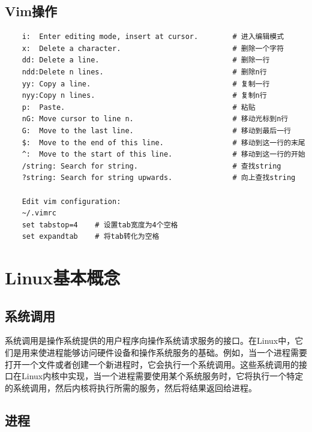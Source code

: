 \documentclass[12pt, a4paper, oneside]{ctexbook}
\numberwithin{figure}{section}
\begin{document}
\subsection{Vim操作}
\begin{verbatim}
    i:  Enter editing mode, insert at cursor.        # 进入编辑模式
    x:  Delete a character.                          # 删除一个字符
    dd: Delete a line.                               # 删除一行
    ndd:Delete n lines.                              # 删除n行
    yy: Copy a line.                                 # 复制一行
    nyy:Copy n lines.                                # 复制n行
    p:  Paste.                                       # 粘贴
    nG: Move cursor to line n.                       # 移动光标到n行
    G:  Move to the last line.                       # 移动到最后一行
    $:  Move to the end of this line.                # 移动到这一行的末尾
    ^:  Move to the start of this line.              # 移动到这一行的开始
    /string: Search for string.                      # 查找string
    ?string: Search for string upwards.              # 向上查找string
    
    Edit vim configuration:
    ~/.vimrc
    set tabstop=4    # 设置tab宽度为4个空格
    set expandtab    # 将tab转化为空格
    \end{verbatim}
\section{Linux基本概念}

\subsection{系统调用}
    
系统调用是操作系统提供的用户程序向操作系统请求服务的接口。在Linux中，它们是用来使进程能够访问硬件设备和操作系统服务的基础。例如，当一个进程需要打开一个文件或者创建一个新进程时，它会执行一个系统调用。这些系统调用的接口在Linux内核中实现，当一个进程需要使用某个系统服务时，它将执行一个特定的系统调用，然后内核将执行所需的服务，然后将结果返回给进程。

\subsection{进程}
    
\end{document}
